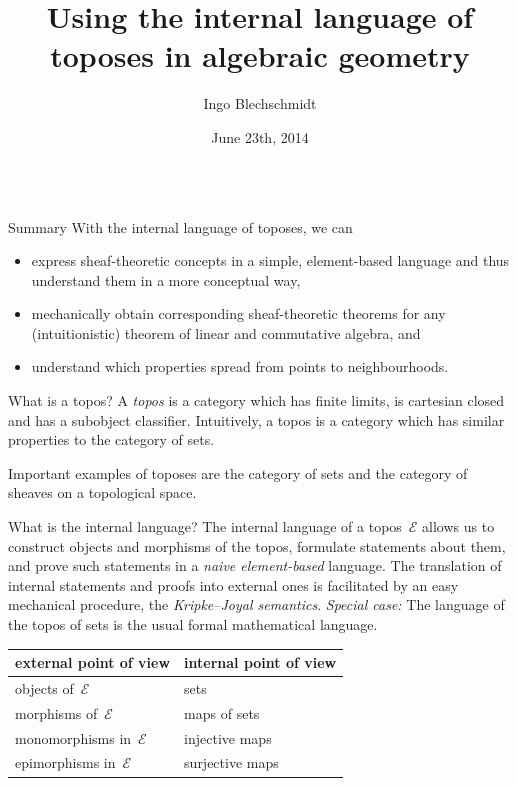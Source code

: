 \documentclass[table]{beamer}
\title{Using the internal language of toposes in algebraic geometry}
\author{Ingo Blechschmidt}
\institute{University of Augsburg}
\date{June 23th, 2014}
\newcommand{\E}{\mathcal{E}}
\begin{document}
\begin{frame}[t]\begin{columns}[t]

\begin{column}{0.3\textwidth}
  \begin{alertblock}{Summary}
    With the internal language of toposes, we can
    \begin{itemize}\justifying
    \item express sheaf-theoretic
    concepts in a simple, ele\-ment-ba\-sed language and thus understand them
    in a more conceptual way,
    \item mechanically obtain
    corresponding sheaf-theo\-re\-tic theorems for any (intuitionistic) theorem of
    linear and commutative algebra, and
    \item understand which properties spread from
    points to neighbourhoods.
    \end{itemize}
  \end{alertblock}
  \bigskip

  \begin{block}{What is a topos?}
    A \emph{topos} is a category which has finite limits, is cartesian closed and
    has a subobject classifier. Intuitively, a topos is a category which has
    similar properties to the category of sets.\medskip

    Important examples of toposes are
    the category of sets and
    the category of sheaves on a topological space.
  \end{block}
  \bigskip

  \begin{block}{What is the internal language?}
    The internal language of a topos~$\E$ allows us to
    construct objects and morphisms of the topos,
    formulate statements about them, and
    prove such statements
    in a \emph{naive element-based} language.
    The translation of internal statements and proofs into external ones is
    facilitated by an easy mechanical procedure, the \emph{Kripke--Joyal
    semantics}.
    \emph{Special case:} The language of the topos of sets is the usual
    formal mathematical language.

    \begin{center}
      \begin{tabular}{ll}
        \toprule
        external point of view & internal point of view \\
        \midrule
        objects of~$\E$ & sets \\
        morphisms of~$\E$ & maps of sets \\
        monomorphisms in~$\E$ & injective maps \\
        epimorphisms in~$\E$ & surjective maps \\
        \bottomrule
      \end{tabular}
    \end{center}
  \end{block}


\end{column}
\end{columns}
\end{frame}
\end{document}
